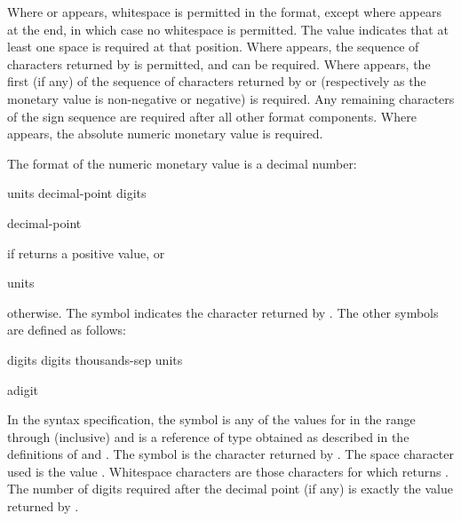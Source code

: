\pnum
Where  or  appears,
whitespace is permitted in the format,
except where  appears at the end,
in which case no whitespace is permitted.
The value  indicates that
at least one space is required at that position.
Where  appears,
the sequence of characters returned by  is permitted, and
can be required.
Where  appears,
the first (if any) of the sequence of characters returned by
 or 
(respectively as the monetary value is non-negative or negative) is required.
Any remaining characters of the sign sequence are required after
all other format components.
Where  appears, the absolute numeric monetary value is required.

\pnum
The format of the numeric monetary value is a decimal number:
\begin{ncbnf}
\br
    units \br
    decimal-point digits
\end{ncbnf}
\begin{ncbnf}
\br
    decimal-point 
\end{ncbnf}
if  returns a positive value, or
\begin{ncbnf}
\br
    units
\end{ncbnf}
otherwise.
The symbol 
indicates the character returned by .
The other symbols are defined as follows:
\begin{ncbnf}
\br
    digits\br
    digits thousands-sep units
\end{ncbnf}

\begin{ncbnf}
\br
    adigit 
\end{ncbnf}

In the syntax specification,
the symbol  is any of the values 
for  in the range  through  (inclusive) and
 is a reference of type 
obtained as described in the definitions
of  and .
The symbol 
is the character returned by .
The space character used is the value .
Whitespace characters are those characters 
for which  returns .
The number of digits required after the decimal point (if any)
is exactly the value returned by .

